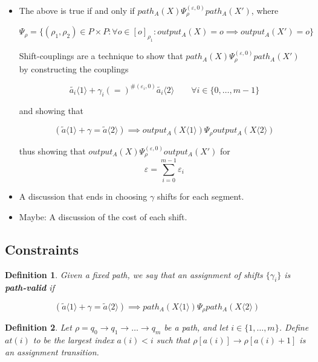 \documentclass{article}
\newtheorem{definition}{Definition}[section]
\renewcommand{\epsilon}{\varepsilon}
\newcommand{\1}{\langle 1 \rangle}
\newcommand{\2}{\langle 2 \rangle}
\begin{document}
\begin{itemize}
    \item The above is true if and only if $path_A(X) \Psi_\rho^{(\epsilon, 0)} path_A(X')$, where

    \[\Psi_\rho = \{(\rho_1, \rho_2) \in P \times P : \forall o \in [o]_{\rho_1} : output_A(X) = o \implies output_A(X') = o \} \]
    
    Shift-couplings are a technique to show that $path_A(X) \Psi_\rho^{(\epsilon, 0)} path_A(X')$ by constructing the couplings
    
    \[\tilde{a_i} \1 + \gamma_i (=)^{\#(\epsilon_i, 0)} \tilde{a_i} \2 \qquad \forall i \in \{0, \dots, m - 1\}\]

    and showing that 

    \[(\tilde{a} \1 + \gamma = \tilde{a} \2) \implies output_A(X \1) \Psi_\rho output_A(X \2)\]

    thus showing that $output_A(X) \Psi_\rho^{(\epsilon, 0)} output_A(X')$ for \[\epsilon = \sum_{i = 0}^{m - 1} \epsilon_i\]
    
    
    \item A discussion that ends in choosing $\gamma$ shifts for each segment. 
    \item Maybe: A discussion of the cost of each shift.    
\end{itemize}


\subsection{Constraints} 

\begin{definition}
    
Given a fixed path, we say that an assignment of shifts $\{\gamma_i\}$ is \textbf{path-valid} if

\[(\tilde{a} \1 + \gamma = \tilde{a} \2) \implies path_A(X \1) \Psi_\rho path_A(X \2)\]

\end{definition}

\begin{definition}
    Let $\rho = q_0 \to q_1 \to \dots \to q_m$ be a path, and let $i \in \{1, \dots, m\}$. Define $at(i)$ to be the largest index $a(i) < i$ such that $\rho[a(i)] \to \rho[a(i) + 1]$ is an assignment transition.  
\end{definition}
\end{document}
